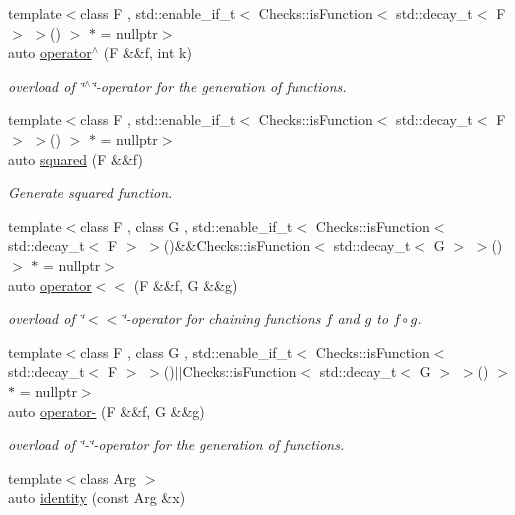 \begin{DoxyCompactItemize}
{\footnotesize template$<$class F , std\+::enable\+\_\+if\+\_\+t$<$ Checks\+::is\+Function$<$ std\+::decay\+\_\+t$<$ F $>$ $>$() $>$ $\ast$  = nullptr$>$ }\\auto \hyperlink{namespaceFunG_a94273e3ea80324e591bb98ae3c051221}{operator$^\wedge$} (F \&\&f, int k)
\begin{DoxyCompactList}\small\item\em overload of \char`\"{}$^\wedge$\char`\"{}-\/operator for the generation of functions. \end{DoxyCompactList}\item 
{\footnotesize template$<$class F , std\+::enable\+\_\+if\+\_\+t$<$ Checks\+::is\+Function$<$ std\+::decay\+\_\+t$<$ F $>$ $>$() $>$ $\ast$  = nullptr$>$ }\\auto \hyperlink{namespaceFunG_ac4ffc0754104af6ddf114e154251db78}{squared} (F \&\&f)
\begin{DoxyCompactList}\small\item\em Generate squared function. \end{DoxyCompactList}\item 
{\footnotesize template$<$class F , class G , std\+::enable\+\_\+if\+\_\+t$<$ Checks\+::is\+Function$<$ std\+::decay\+\_\+t$<$ F $>$ $>$()\&\&\+Checks\+::is\+Function$<$ std\+::decay\+\_\+t$<$ G $>$ $>$() $>$ $\ast$  = nullptr$>$ }\\auto \hyperlink{namespaceFunG_a65436d4494e99629b0177d0df7634a6b}{operator$<$$<$} (F \&\&f, G \&\&g)
\begin{DoxyCompactList}\small\item\em overload of \char`\"{}$<$$<$\char`\"{}-\/operator for chaining functions $f$ and $g$ to $ f \circ g $. \end{DoxyCompactList}\item 
{\footnotesize template$<$class F , class G , std\+::enable\+\_\+if\+\_\+t$<$ Checks\+::is\+Function$<$ std\+::decay\+\_\+t$<$ F $>$ $>$()$\vert$$\vert$\+Checks\+::is\+Function$<$ std\+::decay\+\_\+t$<$ G $>$ $>$() $>$ $\ast$  = nullptr$>$ }\\auto \hyperlink{namespaceFunG_a3af04c2ef5c1b206feb75fffd298cbbf}{operator-\/} (F \&\&f, G \&\&g)
\begin{DoxyCompactList}\small\item\em overload of \char`\"{}-\/\char`\"{}-\/operator for the generation of functions. \end{DoxyCompactList}\item 
{\footnotesize template$<$class Arg $>$ }\\auto \hyperlink{namespaceFunG_a165e879e76d3a2a8906938f3658445ce}{identity} (const Arg \&x)

\end{DoxyCompactItemize}
